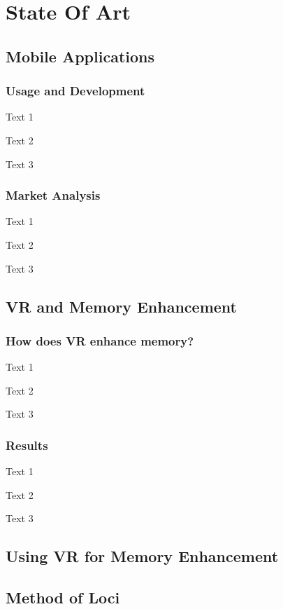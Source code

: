 \chapter{State Of Art}
\label{chap:art}

\section{Mobile Applications} \label{sec:a1}

\subsection{Usage and Development} \label{sec:a1.1}
Text 1

Text 2

Text 3

\subsection{Market Analysis} \label{sec:a1.2}
Text 1

Text 2

Text 3

\section{VR and Memory Enhancement} \label{sec:a2}

\subsection{How does VR enhance memory?} \label{sec:a2.1}
Text 1

Text 2

Text 3

\subsection{Results} \label{sec:a2.2}
Text 1

Text 2

Text 3

\section{Using VR for Memory Enhancement} \label{sec:a3}

\section{Method of Loci} \label{sec:a4}

